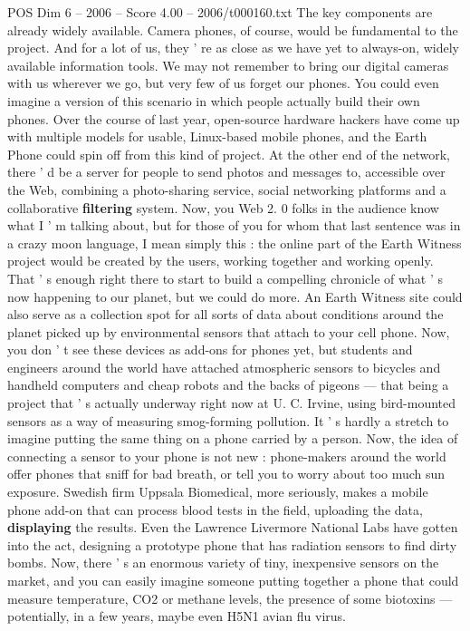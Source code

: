 \begin{textsample}{POS Dim 6 – 2006 – Score 4.00 – 2006/t000160.txt}
The key components are already widely available.
Camera phones, of course, would be fundamental to the project.
And for a lot of us, they ' re as close as we have yet to always-on, widely available information tools.
We may not remember to bring our digital cameras with us wherever we go, but very few of us forget our phones.
You could even imagine a version of this scenario in which people actually build their own phones.
Over the course of last year, open-source hardware hackers have come up with multiple models for usable, Linux-based mobile phones, and the Earth Phone could spin off from this kind of project.
At the other end of the network, there ' d be a server for people to send photos and messages to, accessible over the Web, combining a photo-sharing service, social networking platforms and a collaborative \textbf{filtering} system.
Now, you Web 2. 0 folks in the audience know what I ' m talking about, but for those of you for whom that last sentence was in a crazy moon language, I mean simply this : the online part of the Earth Witness project would be created by the users, working together and working openly.
That ' s enough right there to start to build a compelling chronicle of what ' s now happening to our planet, but we could do more.
An Earth Witness site could also serve as a collection spot for all sorts of data about conditions around the planet picked up by environmental sensors that attach to your cell phone.
Now, you don ' t see these devices as add-ons for phones yet, but students and engineers around the world have attached atmospheric sensors to bicycles and handheld computers and cheap robots and the backs of pigeons — that being a project that ' s actually underway right now at U.
C.
Irvine, using bird-mounted sensors as a way of measuring smog-forming pollution.
It ' s hardly a stretch to imagine putting the same thing on a phone carried by a person.
Now, the idea of connecting a sensor to your phone is not new : phone-makers around the world offer phones that sniff for bad breath, or tell you to worry about too much sun exposure.
Swedish firm Uppsala Biomedical, more seriously, makes a mobile phone add-on that can process blood tests in the field, uploading the data, \textbf{displaying} the results.
Even the Lawrence Livermore National Labs have gotten into the act, designing a prototype phone that has radiation sensors to find dirty bombs.
Now, there ' s an enormous variety of tiny, inexpensive sensors on the market, and you can easily imagine someone putting together a phone that could measure temperature, CO2 or methane levels, the presence of some biotoxins — potentially, in a few years, maybe even H5N1 avian flu virus.

\end{textsample}
